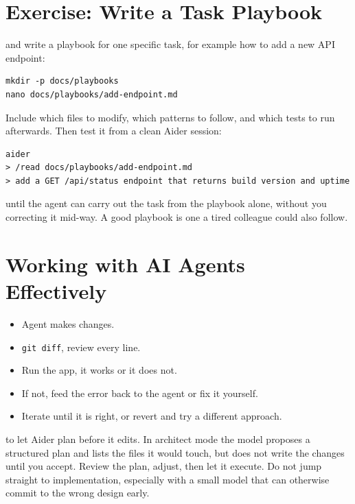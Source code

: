 \section{Exercise: Write a Task Playbook}

 and write a playbook for one specific
task, for example how to add a new API endpoint:

\begin{verbatim}
mkdir -p docs/playbooks
nano docs/playbooks/add-endpoint.md
\end{verbatim}

Include which files to modify, which patterns to follow, and which tests to run afterwards. Then
test it from a clean Aider session:

\begin{verbatim}
aider
> /read docs/playbooks/add-endpoint.md
> add a GET /api/status endpoint that returns build version and uptime
\end{verbatim}

 until the agent can carry out the task from the playbook alone,
without you correcting it mid-way. A good playbook is one a tired colleague could also follow.

\newpage
\section{Working with AI Agents Effectively}

\begin{itemize}
    \item Agent makes changes.
    \item \texttt{git diff}, review every line.
    \item Run the app, it works or it does not.
    \item If not, feed the error back to the agent or fix it yourself.
    \item Iterate until it is right, or revert and try a different approach.
\end{itemize}

 to let Aider plan before it edits. In architect mode the model
proposes a structured plan and lists the files it would touch, but does not write the changes until
you accept. Review the plan, adjust, then let it execute. Do not jump straight to implementation,
especially with a small model that can otherwise commit to the wrong design early.

